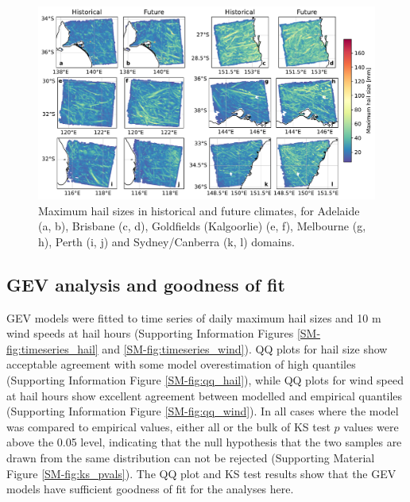 \documentclass[]{agujournal2019}\usepackage[]{graphicx}\usepackage[]{xcolor}
\begin{document}
\begin{figure}[!h]
      \includegraphics[width=\textwidth]{figures/max_hail_sizes_by_domain}
      \caption{Maximum hail sizes in historical and future climates, for Adelaide (a, b), Brisbane (c, d), Goldfields (Kalgoorlie) (e, f), Melbourne (g, h), Perth (i, j) and Sydney/Canberra (k, l) domains.}
      \label{fig:max_hail_sizes_by_domain}
\end{figure}

\subsection{GEV analysis and goodness of fit}

GEV models were fitted to time series of daily maximum hail sizes and 10 m wind speeds at hail hours (Supporting Information Figures \ref{SM-fig:timeseries_hail} and \ref{SM-fig:timeseries_wind}). QQ plots for hail size show acceptable agreement with some model overestimation of high quantiles (Supporting Information Figure \ref{SM-fig:qq_hail}), while QQ plots for wind speed at hail hours show excellent agreement between modelled and empirical quantiles (Supporting Information Figure \ref{SM-fig:qq_wind}). In all cases where the model was compared to empirical values, either all or the bulk of KS test $p$ values were above the 0.05 level, indicating that the null hypothesis that the two samples are drawn from the same distribution can not be rejected (Supporting Material Figure \ref{SM-fig:ks_pvals}). The QQ plot and KS test results show that the GEV models have sufficient goodness of fit for the analyses here. 
 
\end{document}
